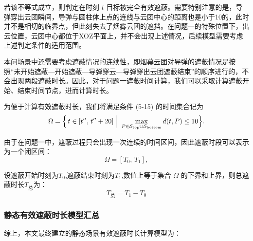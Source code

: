 \documentclass[withoutpreface,bwprint]{cumcmthesis}
\numberwithin{equation}{section} %
\numberwithin{figure}{section} %
\numberwithin{table}{section}  %
\begin{document}
若该不等式成立，则判定在时刻 $t$ 目标被完全有效遮蔽。需要特别注意的是，导弹穿出云团瞬间，导弹与圆柱体上点的连线与云团中心的距离也是小于10的，此时并不是相切的临界点，但此刻失去了烟雾云团的遮挡。在问题一的特殊位置下，出云位置，云团中心都位于XOZ平面上，并不会出现上述情况，后续模型需要考虑上述判定条件的适用范围。

本问场景中还需要考虑遮蔽情况的连续性，即烟幕云团对导弹的遮蔽情况是按照“未开始遮蔽—开始遮蔽—导弹穿云—导弹穿出云团遮蔽结束”的顺序进行的，不会出现两段遮蔽时长。因此，对于问题一遮蔽时间计算，我们可以采取计算遮蔽开始、结束时间节点，进而计算时长。

为便于计算有效遮蔽时长，我们将满足条件 (5-15) 的时间集合记为
\begin{equation}
\Omega = \Bigl\{\,t \in [t'',\,t''+20]\ \Big|\ 
\max_{P\in \mathcal S_{\text{top}} \cup \mathcal S_{\text{bottom}}} d(t,P) \leq 10
\Bigr\}.
\end{equation}

由于在问题一中，遮蔽过程只会出现一次连续的时间区间，因此遮蔽时段可以表示为一个闭区间：
\begin{equation}
\Omega = [T_0,\,T_1],
\end{equation}

设遮蔽开始时刻为$T_0$,遮蔽结束时刻为$T_1$,数值上等于集合 $\Omega$ 的下界和上界，则总遮蔽时长$T_\text{总}$为：
\begin{equation}
    T_\text{总}=T_1-T_0
\end{equation}

\subsubsection{静态有效遮蔽时长模型汇总}
综上，本文最终建立的静态场景有效遮蔽时长计算模型为：
\end{document}
